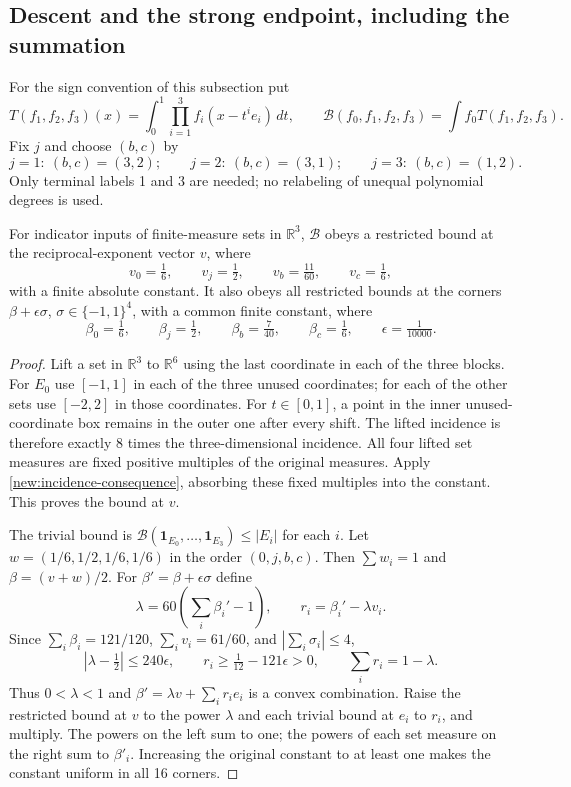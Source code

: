 \documentclass[11pt]{article}
\theoremstyle{definition}
\newcommand{\one}{\mathbf 1}
\newcommand{\R}{\mathbb R}
\begin{document}
\subsection{Descent and the strong endpoint, including the summation}
For the sign convention of this subsection put
\[
 T(f_1,f_2,f_3)(x)=\int_0^1\prod_{i=1}^3f_i(x-t^ie_i)\,dt,
 \qquad \mathcal B(f_0,f_1,f_2,f_3)=\int f_0T(f_1,f_2,f_3).
\]
Fix $j$ and choose $(b,c)$ by
\[
 j=1:\ (b,c)=(3,2);\qquad j=2:\ (b,c)=(3,1);\qquad
 j=3:\ (b,c)=(1,2).
\]
Only terminal labels 1 and 3 are needed; no relabeling of unequal polynomial degrees is used.

\begin{lemma}\label{new:restricted-neighborhood}
For indicator inputs of finite-measure sets in $\R^3$, $\mathcal B$ obeys a restricted
bound at the reciprocal-exponent vector $v$, where
\[
 v_0=\tfrac16,\qquad v_j=\tfrac12,\qquad v_b=\tfrac{11}{60},\qquad v_c=\tfrac16,
\]
with a finite absolute constant. It also obeys all restricted bounds at the corners
$\beta+\epsilon\sigma$, $\sigma\in\{-1,1\}^4$, with a common finite constant, where
\[
 \beta_0=\tfrac16,\qquad\beta_j=\tfrac12,\qquad
 \beta_b=\tfrac7{40},\qquad\beta_c=\tfrac16,\qquad\epsilon=\tfrac1{10000}.
\]
\end{lemma}
\begin{proof}
Lift a set in $\R^3$ to $\R^6$ using the last coordinate in each of the three blocks.
For $E_0$ use $[-1,1]$ in each of the three unused coordinates; for each of the other
sets use $[-2,2]$ in those coordinates. For $t\in[0,1]$, a point in the inner unused-coordinate
box remains in the outer one after every shift. The lifted incidence is therefore exactly
$8$ times the three-dimensional incidence. All four lifted set measures are fixed positive
multiples of the original measures. Apply \cref{new:incidence-consequence}, absorbing these
fixed multiples into the constant. This proves the bound at $v$.

The trivial bound is $\mathcal B(\one_{E_0},\ldots,\one_{E_3})\leq|E_i|$ for each $i$.
Let $w=(1/6,1/2,1/6,1/6)$ in the order $(0,j,b,c)$. Then $\sum w_i=1$ and
$\beta=(v+w)/2$. For $\beta'=\beta+\epsilon\sigma$ define
\[
 \lambda=60\left(\sum_i\beta_i'-1\right),\qquad r_i=\beta_i'-\lambda v_i.
\]
Since $\sum_i\beta_i=121/120$, $\sum_i v_i=61/60$, and $|\sum_i\sigma_i|\leq4$,
\[
 |\lambda-\tfrac12|\leq240\epsilon,
 \qquad r_i\geq\tfrac1{12}-121\epsilon>0,
 \qquad \sum_i r_i=1-\lambda.
\]
Thus $0<\lambda<1$ and $\beta'=\lambda v+\sum_i r_i e_i$ is a convex combination.
Raise the restricted bound at $v$ to the power $\lambda$ and each trivial bound at $e_i$
to $r_i$, and multiply. The powers on the left sum to one; the powers of each set measure
on the right sum to $\beta'_i$. Increasing the original constant to at least one makes the
constant uniform in all 16 corners.
\end{proof}
\end{document}
